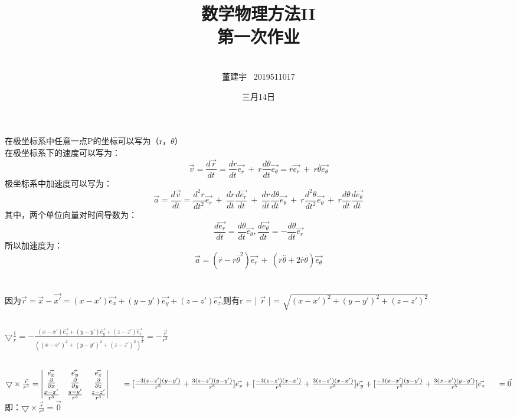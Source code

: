 \documentclass[10.5pt]{article}
\title{数学物理方法II\\第一次作业}
\author{\\董建宇  ~2019511017}
\date{三月14日}
\begin{document}
\maketitle
\newpage
\large
\section{}
在极坐标系中任意一点P的坐标可以写为（r，$\theta $）\\
\indent
在极坐标系下的速度可以写为：$$\vec{v} = \frac{d^{} \vec{r} }{d t^{}} = \frac{dr}{dt} \vec{e_r} ~+~ r\frac{d\theta }{dt}\vec{e_\theta } = \overset{.}{r} \vec{e_r} ~+~ r\overset{.}{\theta }\vec{e_\theta }$$
\indent
极坐标系中加速度可以写为：$$\vec{a} = \frac{d \vec{v}}{dt} = \frac{d^2r}{dt^2}\vec{e_r} ~+~ \frac{dr}{dt} \frac{d \vec{e_r}}{dt } ~+~ \frac{dr}{dt} \frac{d\theta }{dt} \vec{e_\theta } ~+~ r \frac{d^2 \theta }{dt^2} \vec{e_\theta } ~+~ r\frac{d\theta }{dt} \frac{d\vec{e_\theta}}{dt}$$
\indent
其中，两个单位向量对时间导数为：$$\frac{d \vec{e_r}}{dt} = \frac{d\theta }{dt} \vec{e_\theta}, \frac{d\vec{e_\theta}}{dt} = -\frac{d\theta }{dt} \vec{e_r}$$\indent
所以加速度为：$$\vec{a} = (\overset{..}{r}-r\overset{.}{\theta}^2)\vec{e_r} ~+~ (r\overset{..}{\theta } + 2\overset{.}{r}\overset{.}{\theta })\vec{e_\theta }$$

\section{}
因为$\vec{r} = \vec{x} - \vec{x'} = (x - x')\vec{e_x} + (y-y')\vec{e_y} + (z-z')\vec{e_z}$,则有r = | $\vec{r}$ | = $\sqrt{(x-x')^2 + (y-y')^2 + (z-z')^2} $\\
\subsection{}\large
$\bigtriangledown \frac{1}{r} = -\frac{(x-x')\vec{e_x} + (y-y')\vec{e_y} + (z-z')\vec{e_z}}{\left((x-x')^2 + (y-y')^2 + (z-z')^2\right)^{\frac{3}{2}}} = -\frac{\vec{r}}{r^ 3}$

\subsection{}\large
$\bigtriangledown \times \frac{\vec{r}}{r^3} = 
\begin{vmatrix}
    \vec{e_x} & \vec{e_y} & \vec{e_z}\\
    \frac{\partial}{\partial x} & \frac{\partial}{\partial y} & \frac{\partial}{\partial z}\\
    \frac{x-x'}{r^3} & \frac{y-y'}{r^3} & \frac{z-z'}{r^3}
\end{vmatrix}\\\indent
= [\frac{-3(z-z')(y-y')}{r^5}+\frac{3(z-z')(y-y')}{r^5}]\vec{e_x} + [\frac{-3(z-z')(x-x')}{r^5}+\frac{3(z-z')(x-x')}{r^5}]\vec{e_y} + [\frac{-3(x-x')(y-y')}{r^5}+\frac{3(x-x')(y-y')}{r^5}]\vec{e_z} \\\indent
= \vec{0}
$\\
\indent
即：$\bigtriangledown \times \frac{\vec{r}}{r^3} = \vec{0}$
\end{document}
